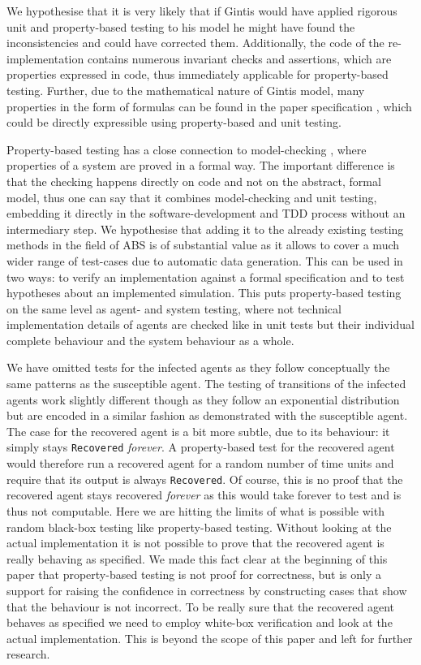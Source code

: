 We hypothesise that it is very likely that if Gintis \cite{gintis_emergence_2006} would have applied rigorous unit and property-based testing to his model he might have found the inconsistencies and could have corrected them. Additionally, the code of the re-implementation \cite{evensen_extensible_2010} contains numerous invariant checks and assertions, which are properties expressed in code, thus immediately applicable for property-based testing. Further, due to the mathematical nature of Gintis model, many properties in the form of formulas can be found in the paper specification \cite{gintis_emergence_2006}, which could be directly expressible using property-based and unit testing. 

Property-based testing has a close connection to model-checking \cite{mcmillan_symbolic_1993}, where properties of a system are proved in a formal way. The important difference is that the checking happens directly on code and not on the abstract, formal model, thus one can say that it combines model-checking and unit testing, embedding it directly in the software-development and TDD process without an intermediary step. We hypothesise that adding it to the already existing testing methods in the field of ABS is of substantial value as it allows to cover a much wider range of test-cases due to automatic data generation. This can be used in two ways: to verify an implementation against a formal specification and to test hypotheses about an implemented simulation. This puts property-based testing on the same level as agent- and system testing, where not technical implementation details of agents are checked like in unit tests but their individual complete behaviour and the system behaviour as a whole.

\medskip

We have omitted tests for the infected agents as they follow conceptually the same patterns as the susceptible agent. The testing of transitions of the infected agents work slightly different though as they follow an exponential distribution but are encoded in a similar fashion as demonstrated with the susceptible agent. The case for the recovered agent is a bit more subtle, due to its behaviour: it simply stays \texttt{Recovered} \textit{forever}. A property-based test for the recovered agent would therefore run a recovered agent for a random number of time units and require that its output is always \texttt{Recovered}. Of course, this is no proof that the recovered agent stays recovered \textit{forever} as this would take forever to test and is thus not computable. Here we are hitting the limits of what is possible with random black-box testing like property-based testing. Without looking at the actual implementation it is not possible to prove that the recovered agent is really behaving as specified. We made this fact clear at the beginning of this paper that property-based testing is not proof for correctness, but is only a support for raising the confidence in correctness by constructing cases that show that the behaviour is not incorrect. To be really sure that the recovered agent behaves as specified we need to employ white-box verification and look at the actual implementation. This is beyond the scope of this paper and left for further research.

